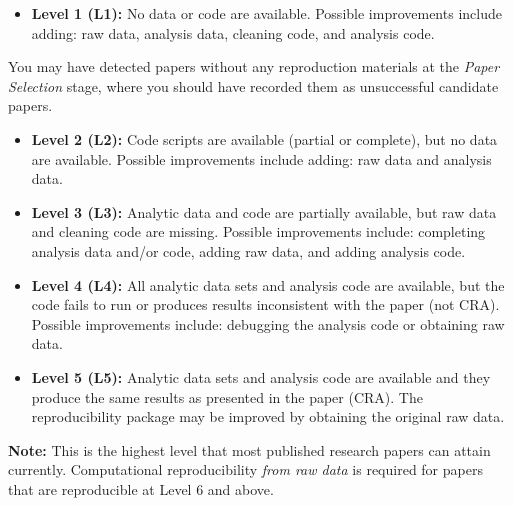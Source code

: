 \documentclass[
]{book}
\providecommand{\tightlist}{%
  \setlength{\itemsep}{0pt}\setlength{\parskip}{0pt}}
\begin{document}
\begin{itemize}
\tightlist
\item
  \textbf{Level 1 (L1):} No data or code are available. Possible improvements include adding: raw data, analysis data, cleaning code, and analysis code.
\end{itemize}

You may have detected papers without any reproduction materials at the \emph{Paper Selection} stage, where you should have recorded them as unsuccessful candidate papers.

\begin{itemize}
\item
  \textbf{Level 2 (L2):} Code scripts are available (partial or complete), but no data are available. Possible improvements include adding: raw data and analysis data.
\item
  \textbf{Level 3 (L3):} Analytic data and code are partially available, but raw data and cleaning code are missing. Possible improvements include: completing analysis data and/or code, adding raw data, and adding analysis code.
\item
  \textbf{Level 4 (L4):} All analytic data sets and analysis code are available, but the code fails to run or produces results inconsistent with the paper (not CRA). Possible improvements include: debugging the analysis code or obtaining raw data.
\item
  \textbf{Level 5 (L5):} Analytic data sets and analysis code are available and they produce the same results as presented in the paper (CRA). The reproducibility package may be improved by obtaining the original raw data.
\end{itemize}

\textbf{Note:} This is the highest level that most published research papers can attain currently. Computational reproducibility \emph{from raw data} is required for papers that are reproducible at Level 6 and above.
\end{document}
